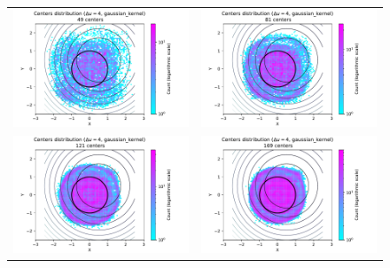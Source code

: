 \documentclass[12pt]{report} %
\begin{document}
\begin{figure}[h]
  \hspace*{-2cm}
  \begin{tabular}{cc}
    \includegraphics[width=.6\textwidth]{imagenes/experiments/2d/pde_parabola/circle_c49_pde_gaussian_kernel.pdf} &
    \includegraphics[width=.6\textwidth]{imagenes/experiments/2d/pde_parabola/circle_c81_pde_gaussian_kernel.pdf} \\
    \includegraphics[width=.6\textwidth]{imagenes/experiments/2d/pde_parabola/circle_c121_pde_gaussian_kernel.pdf} &
    \includegraphics[width=.6\textwidth]{imagenes/experiments/2d/pde_parabola/circle_c169_pde_gaussian_kernel.pdf}\\

\end{tabular}
\end{figure}
\end{document}
